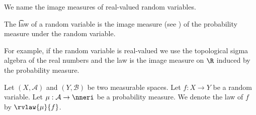 

We name the image measures of real-valued random variables.


The \t{law} of a random variable is the image measure (see ) of the probability measure under the random variable.

For example, if the random variable is real-valued we use the topological sigma algebra of the real numbers and the law is the image measure on $\R$ induced by the probability measure.


Let $(X, \mathcal{A})$ and $(Y, \mathcal{B})$ be two measurable spaces.
Let $f: X \to Y$ be a random variable.  Let $\mu: \mathcal{A} \to \nneri$ be a probability measure.
We denote the law of $f$ by $\rvlaw{\mu}{f}$.

\blankpage
